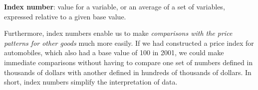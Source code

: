 \begin{DefBox}
\textbf{Index number}: value for a variable, or an average of a set of variables, expressed relative to a given base value.
\end{DefBox}

Furthermore, index numbers enable us to make \textit{comparisons with the
price patterns for other goods} much more easily. If we had constructed a
price index for automobiles, which also had a base value of 100 in 2001, we
could make immediate comparisons without having to compare one set of
numbers defined in thousands of dollars with another defined in hundreds of
thousands of dollars. In short, index numbers simplify the interpretation of
data.

